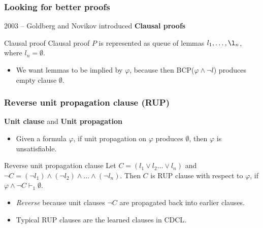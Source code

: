 \documentclass[xcolor=dvipsnames]{beamer}
\begin{document}
\begin{frame}
    \frametitle{ Looking for better proofs }
    2003 -- Goldberg and Novikov introduced \textbf{Clausal proofs}
	\begin{block}{Clausal proof}
		Clausal proof $P$ is represented as queue of lemmas $l_1, \dots, \l_n$, where $l_n = \emptyset$.
	\end{block}

    \pause
    \begin{itemize}[<+->]
            \item We want lemmas to be implied by $\varphi$, because then
                  BCP($\varphi \wedge \neg l$) produces empty clause $\emptyset$.
    \end{itemize}
\end{frame}

\begin{frame}
  \frametitle{Reverse unit propagation clause (RUP)}

    \textbf{Unit clause} and \textbf{Unit propagation}
    \begin{itemize}
  	    \item Given a formula $\varphi$, if unit propagation on $\varphi$ produces $\emptyset$,
	          then $\varphi$ is unsatisfiable.
    \end{itemize}

    \pause
    \begin{block}{Reverse unit propagation clause}
  	  Let $C = (l_1 \vee l_2 \dots \vee l_n )$ and
			  $\neg C = (\neg l_1) \wedge (\neg l_2)
							   \wedge \dots \wedge (\neg l_n)$.
		  Then $C$ is RUP clause with respect to $\varphi$, if $\varphi \wedge \neg C \vdash_1 \emptyset$.
	\end{block}
    \begin{itemize}
      \item \emph{Reverse} because unit clauses $\neg C$ are propagated back into earlier clauses.
      \item Typical RUP clauses are the learned clauses in CDCL.
	\end{itemize}
\end{frame}
\end{document}
